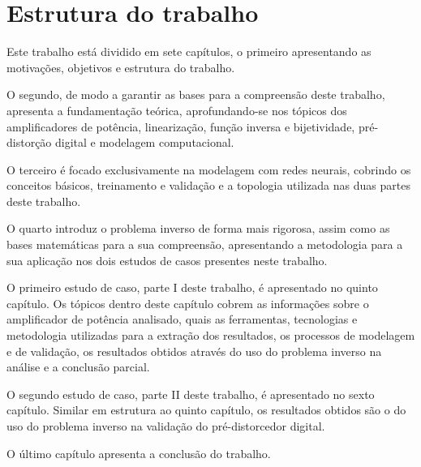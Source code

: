 \section{Estrutura do trabalho} \label{sec:introd-estrut}
Este trabalho está dividido em sete capítulos, o primeiro apresentando as motivações, objetivos e estrutura do trabalho.

O segundo, de modo a garantir as bases para a compreensão deste trabalho, apresenta a fundamentação teórica, aprofundando-se nos tópicos dos amplificadores de potência, linearização, função inversa e bijetividade, pré-distorção digital e modelagem computacional.

O terceiro é focado exclusivamente na modelagem com redes neurais, cobrindo os conceitos básicos, treinamento e validação e a topologia utilizada nas duas partes deste trabalho.

O quarto introduz o problema inverso de forma mais rigorosa, assim como as bases matemáticas para a sua compreensão, apresentando a metodologia para a sua aplicação nos dois estudos de casos presentes neste trabalho.

O primeiro estudo de caso, parte I deste trabalho, é apresentado no quinto capítulo. Os tópicos dentro deste capítulo cobrem as informações sobre o amplificador de potência analisado, quais as ferramentas, tecnologias e metodologia utilizadas para a extração dos resultados, os processos de modelagem e de validação, os resultados obtidos através do uso do problema inverso na análise e a conclusão parcial.

O segundo estudo de caso, parte II deste trabalho, é apresentado no sexto capítulo. Similar em estrutura ao quinto capítulo, os resultados obtidos são o do uso do problema inverso na validação do pré-distorcedor digital.

O último capítulo apresenta a conclusão do trabalho.
